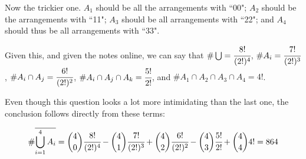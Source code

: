 \documentclass[a4paper]{article}
\begin{document}
Now the trickier one. $A_1$ should be all the arrangements with ``00"; $A_2$ should be the arrangements with ``11"; $A_3$ should be all arrangements with ``22"; and $A_4$ should thus be all arrangements with ``33".

Given this, and given the notes online, we can say that $\#\bigcup = \cfrac{8!}{(2!)^4}$, $\#A_i = \cfrac{7!}{(2!)^3}$, $\#A_i \cap A_j = \cfrac{6!}{(2!)^2}$, $\#A_i \cap A_j \cap A_k = \cfrac{5!}{2!}$, and $\#A_1 \cap A_2 \cap A_3 \cap A_4 = 4!$.

Even though this question looks a lot more intimidating than the last one, the conclusion follows directly from these terms:

\begin{equation}
\# \overline{\bigcup_{i=1}^4 A_i}  = \displaystyle \binom{4}{0} \cfrac{8!}{(2!)^4} - \binom{4}{1} \cfrac{7!}{(2!)^3} + \binom{4}{2} \cfrac{6!}{(2!)^2} - \binom{4}{3} \cfrac{5!}{2!} + \binom{4}{4} 4! = 864
\end{equation}
\end{document}
